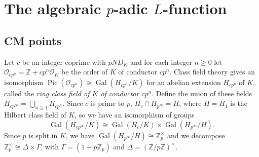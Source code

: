 \documentclass[a4paper,11pt]{amsart}
\numberwithin{equation}{section}
\theoremstyle{plain}
\newtheorem{lemma}[theorem]{Lemma}
\theoremstyle{definition}
\theoremstyle{remark}
\newcommand{\Q}{\mathbb Q}
\newcommand{\Z}{\mathbb Z}
\newcommand{\R}{\mathbb R}
\DeclareMathOperator{\Pic}{Pic}
\DeclareMathOperator{\Gal}{Gal}
\DeclareMathOperator{\M}{M}
\newcommand{\ord}{\mathrm{ord}}
\newcommand{\dR}{\mathrm{dR}}
\begin{document}

\section{The algebraic $p$-adic $L$-function} \label{secBHP}


\subsection{CM points}\label{sec.CMpoints} 
Let $c$ be an integer coprime with $pND_K$ and for each integer $n\geq 0$ let 
$\mathcal{O}_{cp^n}=\Z+cp^n\mathcal{O}_K$ be the order of $K$ of conductor $cp^n$. Class field theory gives an isomorphism 
$\Pic(\mathcal{O}_{cp^n})\cong \Gal(H_{cp^n}/K)$ for an abelian extension $H_{cp^n}$ of $K$, called the \emph{ring class field of $K$ of conductor $cp^n$}. 
Define the union of these fields 
$H_{cp^\infty}=\bigcup_{n\geq 1} H_{cp^n}.$
Since $c$ is prime to $p$, $H_{c}\cap H_{p^\infty}=H$, where $H=H_1$ is the Hilbert class field of $K$, 
so we have an isomorphism of groups 
\[\Gal(H_{cp^\infty}/K)\cong  \Gal(H_c/K)\times\Gal(H_{p^\infty}/H).\]
Since $p$ is split in $K$, we have  $\Gal(H_{p^\infty}/H)\cong \Z_p^\times$ and we decompose $\Z_p^\times\cong \Delta\times\Gamma$, with $\Gamma=(1+p\Z_p)$ and $\Delta=(\Z/p\Z)^\times$.
\end{document}
